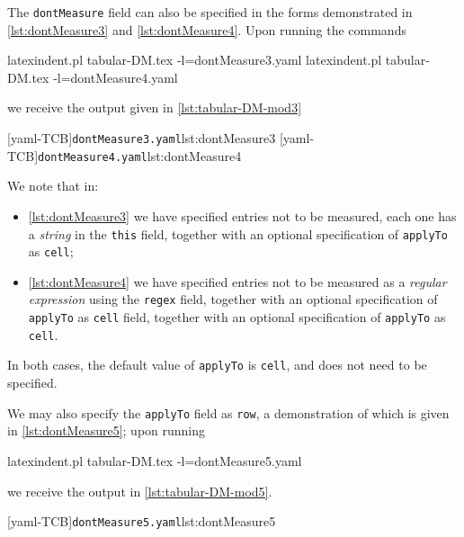  \begin{example}
 The \texttt{dontMeasure} field can also be specified in the forms demonstrated in
 \cref{lst:dontMeasure3} and \cref{lst:dontMeasure4}. Upon running the commands

 \begin{commandshell} 
latexindent.pl tabular-DM.tex -l=dontMeasure3.yaml
latexindent.pl tabular-DM.tex -l=dontMeasure4.yaml
\end{commandshell}

 we receive the output given in \cref{lst:tabular-DM-mod3} 

 \begin{cmhtcbraster}[raster columns=3,
   raster left skip=-3.5cm,
   raster right skip=-2cm,
   raster column skip=.03\linewidth]
  [yaml-TCB]{\texttt{dontMeasure3.yaml}}{lst:dontMeasure3}
  [yaml-TCB]{\texttt{dontMeasure4.yaml}}{lst:dontMeasure4}
 \end{cmhtcbraster}
 We note that in:
 \begin{itemize}
  \item \cref{lst:dontMeasure3} we have specified entries not to be measured, each one has a
        \emph{string} in the \texttt{this}
        field, together with an optional specification of \texttt{applyTo} as \texttt{cell};
  \item \cref{lst:dontMeasure4} we have specified entries not to be measured as a
        \emph{regular expression} using
        the \texttt{regex} field, together with an optional specification of \texttt{applyTo} as
        \texttt{cell} field, together with an optional specification of \texttt{applyTo} as
        \texttt{cell}.
 \end{itemize}
 In both cases, the default value of \texttt{applyTo} is \texttt{cell}, and does not need
 to be specified.
 \end{example}

 \begin{example}
 We may also specify the \texttt{applyTo} field as \texttt{row}, a demonstration of which
 is given in \cref{lst:dontMeasure5}; upon running 

 \begin{commandshell} 
latexindent.pl tabular-DM.tex -l=dontMeasure5.yaml
\end{commandshell}

 we receive the output in \cref{lst:tabular-DM-mod5}.
 \begin{cmhtcbraster}
  [yaml-TCB]{\texttt{dontMeasure5.yaml}}{lst:dontMeasure5}
 \end{cmhtcbraster}
 \end{example}

